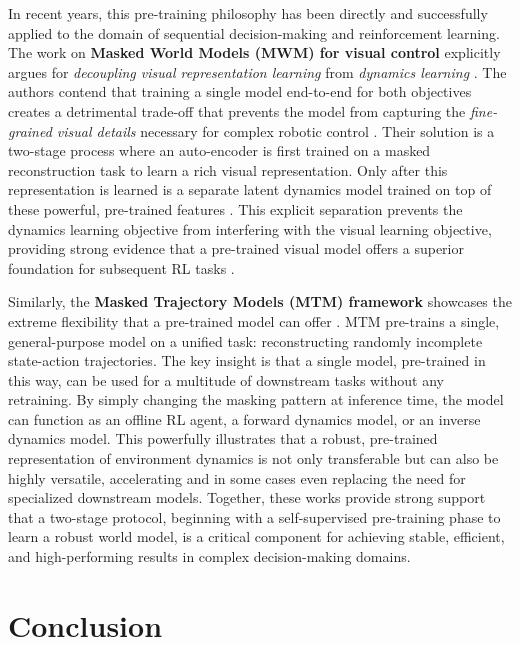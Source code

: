 In recent years, this pre-training philosophy has been directly and successfully applied to the domain of sequential decision-making and reinforcement learning. The work on \textbf{Masked World Models (MWM) for visual control} \parencite{masked_world_models_visual_control} explicitly argues for \textit{decoupling visual representation learning} from \textit{dynamics learning }. The authors \parencite{masked_world_models_visual_control}  contend that training a single model end-to-end for both objectives creates a detrimental trade-off that prevents the model from capturing the \textit{fine-grained visual details} necessary for complex robotic control . Their solution is a two-stage process where an auto-encoder is first trained on a masked reconstruction task to learn a rich visual representation. Only after this representation is learned is a separate latent dynamics model trained on top of these powerful, pre-trained features . This explicit separation prevents the dynamics learning objective from interfering with the visual learning objective, providing strong evidence that a pre-trained visual model offers a superior foundation for subsequent RL tasks .


Similarly, the \textbf{Masked Trajectory Models (MTM)  framework} \parencite{masked_trajectory_models_prediction_representation_control} showcases the extreme 	flexibility that a pre-trained model can offer . MTM pre-trains a single, general-purpose model on a unified task: reconstructing randomly incomplete state-action trajectories. The key insight is that a single model, pre-trained in this way, can be used for a multitude of downstream tasks without any retraining. By simply changing the masking pattern at inference time, the model can function as an offline RL agent, a forward dynamics model, or an inverse dynamics model. This powerfully illustrates that a robust, pre-trained representation of environment dynamics is not only transferable but can also be highly versatile, accelerating and in some cases even replacing the need for specialized downstream models. Together, these works provide strong support  that a two-stage protocol, beginning with a self-supervised pre-training phase to learn a robust world model, is a critical component for achieving stable, efficient, and high-performing results in complex decision-making domains.

\section*{Conclusion}

